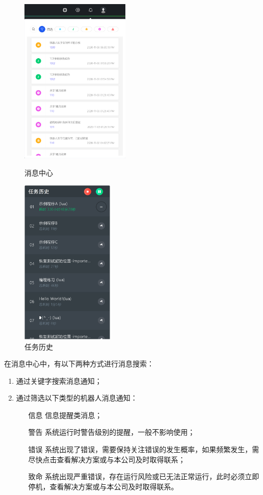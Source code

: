 \begin{figure}[htb]
	\centering
	\begin{minipage}[t]{0.55\linewidth}
		\centering
		\includegraphics[height=8cm]{screen/2-14.png}
		\caption{消息中心}
		\label{fig:消息中心}
	\end{minipage}
	\hfill
	\begin{minipage}[t]{0.4\linewidth}
		\centering
		\includegraphics[height=8cm]{screen/2-15.png}
		\caption{任务历史}
		\label{fig:任务历史}
	\end{minipage}
\end{figure}
在消息中心中，有以下两种方式进行消息搜索：
\begin{enumerate}
	\item 通过关键字搜索消息通知；
	\item 通过筛选以下类型的机器人消息通知：
	\begin{itemize}
\item[\icn{image/29.pdf} 信息] 信息提醒类消息；
\item[\icn{image/28.pdf} 警告] 系统运行时警告级别的提醒，一般不影响使用；
\item[\icn{image/27.pdf} 错误] 系统出现了错误，需要保持关注错误的发生概率，如果频繁发生，需尽快点击查看解决方案或与本公司及时取得联系；
\item[\icn{image/26.pdf} 致命] 系统出现严重错误，存在运行风险或已无法正常运行，此时必须立即停机，查看解决方案或与本公司及时取得联系。
	\end{itemize}
\end{enumerate}

